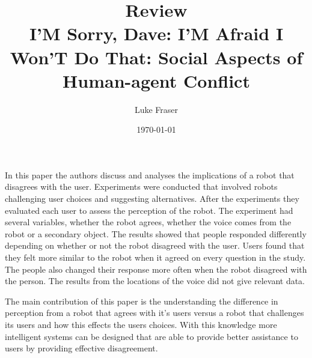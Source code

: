 \documentclass{article}
\begin{document}
\title{{\large Review} \\ I'M Sorry, Dave: I'M Afraid I Won'T Do That: Social Aspects of Human-agent Conflict}
\author{Luke Fraser}
\date{\today}
\maketitle

\begingroup
\renewcommand{\section}[2]{}


\endgroup

\section*{Summary}
In this paper the authors discuss and analyses the implications of a robot that disagrees with the user. Experiments were conducted that involved robots challenging user choices and suggesting alternatives. After the experiments they evaluated each user to assess the perception of the robot. The experiment had several variables, whether the robot agrees, whether the voice comes from the robot or a secondary object. The results showed that people responded differently depending on whether or not the robot disagreed with the user. Users found that they felt more similar to the robot when it agreed on every question in the study. The people also changed their response more often when the robot disagreed with the person. The results from the locations of the voice did not give relevant data.
\section*{Strengths}
The main contribution of this paper is the understanding the difference in perception from a robot that agrees with it's users versus a robot that challenges its users and how this effects the users choices. With this knowledge more intelligent systems can be designed that are able to provide better assistance to users by providing effective disagreement.
\end{document}
